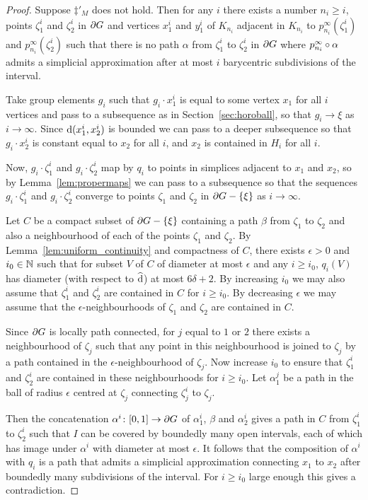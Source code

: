 \documentclass[a4paper]{article}
\begin{document}
\begin{proof}
  Suppose $\ddag'_M$ does not hold. Then for any $i$ there exists a number $n_i
  \geq i$, points $\zeta_1^i$ and $\zeta_2^i$ in $\partial G$ and vertices
  $x_1^i$ and $y_1^i$ of $K_{n_i}$ adjacent in $K_{n_i}$ to
  $p^\infty_{n_i}(\zeta^i_1)$ and $p^\infty_{n_i}(\zeta^i_2)$ such that there
  is no path $\alpha$ from $\zeta_1^i$ to $\zeta_2^i$ in $\partial G$ where
  $p^\infty_{n_i}\circ\alpha$ admits a simplicial approximation after at
  most $i$ barycentric subdivisions of the interval.

  Take group elements $g_i$ such that $g_i\cdot x_1^i$ is equal to some vertex
  $x_1$ for all $i$ vertices and pass to a subsequence as in
  Section~\ref{sec:horoball}, so that $g_i\to\xi$ as $i \to\infty$. Since
  $\operatorname{d}(x_1^i, x_2^i)$ is bounded we can pass to a deeper subsequence so that
  $g_i\cdot x_2^i$ is constant equal to $x_2$ for all $i$, and $x_2$ is
  contained in $H_i$ for all $i$. 

  Now, $g_i\cdot \zeta_1^i$ and $g_i\cdot\zeta_2^i$ map by $q_i$ to points in
  simplices adjacent to $x_1$ and $x_2$, so by Lemma~\ref{lem:propermaps} we
  can pass to a subsequence so that the sequences $g_i\cdot \zeta_1^i$ and
  $g_i\cdot\zeta_2^i$ converge to points $\zeta_1$ and $\zeta_2$ in $\partial
  G - \left\{\xi\right\}$ as $i \to \infty$.
  
  Let $C$ be a compact subset of $\partial G - \left\{\xi\right\}$ containing a path
  $\beta$ from $\zeta_1$ to $\zeta_2$ and also a neighbourhood of each of the
  points $\zeta_1$ and $\zeta_2$. By Lemma~\ref{lem:uniform_continuity} and
  compactness of $C$, there exists $\epsilon > 0$ and $i_0 \in \mathbb{N}$ such
  that for subset $V$ of $C$ of diameter at most $\epsilon$ and any $i \geq
  i_0$, $q_i(V)$ has diameter (with respect to $\operatorname{\widehat{d}}$) at most $6\delta+2$.
  By increasing $i_0$ we may also assume that $\zeta_1^i$ and $\zeta_2^i$ are
  contained in $C$ for $i \geq i_0$. By decreasing $\epsilon$ we may assume
  that the $\epsilon$-neighbourhoods of $\zeta_1$ and $\zeta_2$ are contained
  in $C$. 

  Since $\partial G$ is locally path connected, for $j$ equal to $1$ or $2$
  there exists a neighbourhood of $\zeta_j$ such that any point in this
  neighbourhood is joined to $\zeta_j$ by a path contained in the
  $\epsilon$-neighbourhood of $\zeta_j$. Now increase $i_0$ to ensure that
  $\zeta_1^i$ and $\zeta_2^i$ are contained in these neighbourhoods for $i \geq
  i_0$. Let $\alpha_1^j$ be a path in the ball of radius $\epsilon$ centred at
  $\zeta_j$ connecting $\zeta_j^i$ to $\zeta_j$.

  Then the concatenation $\alpha^i\colon[0,1]\to \partial G$ of $\alpha_1^i$,
  $\beta$ and $\alpha_2^i$ gives a path in $C$ from $\zeta_1^i$ to $\zeta_2^i$
  such that $I$ can be covered by boundedly many open intervals, each of which
  has image under $\alpha^i$ with diameter at most $\epsilon$. It follows that
  the composition of $\alpha^i$ with $q_i$ is a path that admits a simplicial
  approximation connecting $x_1$ to $x_2$ after boundedly many subdivisions of
  the interval. For $i \geq i_0$ large enough this gives a contradiction.
\end{proof}
\end{document}
